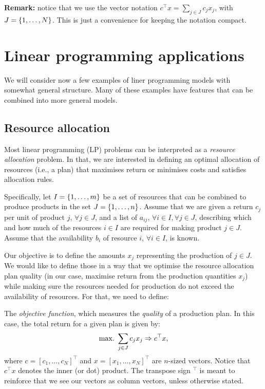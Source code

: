 {\bf Remark:} notice that we use the vector notation $c^\top x = \sum_{j \in J} c_j x_j$, with $J = \left\{ 1,\dots,N \right \}$. This is just a convenience for keeping the notation compact. 


\section{Linear programming applications}

We will consider now a few examples of liner programming models with somewhat general structure. Many of these examples have features that can be combined into more general models.


\subsection{Resource allocation} \label{section_121}

Most linear programming (LP) problems can be interpreted as a \emph{resource allocation} problem. In that, we are interested in defining an optimal allocation of resources (i.e., a plan) that maximises return or minimises costs and satisfies allocation rules. 

Specifically, let $I = \left\{ 1, \dots, m \right \}$ be a set of resources that can be combined to produce products in the set $J = \left\{ 1, \dots, n \right \}$. Assume that we are given a return $c_j$ per unit of product $j$, $\forall j \in J$, and a list of $a_{ij}$, $\forall i \in I, \forall j \in J$, describing which and how much of the resources $i \in I$ are required for making product $j \in J$. Assume that the availability $b_i$ of resource $i$, $\forall i\in I$, is known. 

Our objective is to define the amounts $x_j$ representing the production of $j \in J$. We would like to define those in a way that we optimise the resource allocation plan quality (in our case, maximise return from the production quantities $x_j$) while making sure the resources needed for production do not exceed the availability of resources. For that, we need to define: 

The \emph{objective function}, which measures the \emph{quality} of a production plan. In this case, the total return for a given plan is given by:
%
\begin{equation*}
	\mathop{\text{max.~}} \sum_{j \in J}c_jx_j \Rightarrow c^\top x,
\end{equation*}
%
where $c = [c_1, \dots, c_{N}]^\top$ and $x = [x_1, \dots, x_{N}]^\top$ are $n$-sized vectors. Notice that $c^\top x$ denotes the inner (or dot) product. The transpose sign $^\top$ is meant to reinforce that we see our vectors as column vectors, unless otherwise stated.

